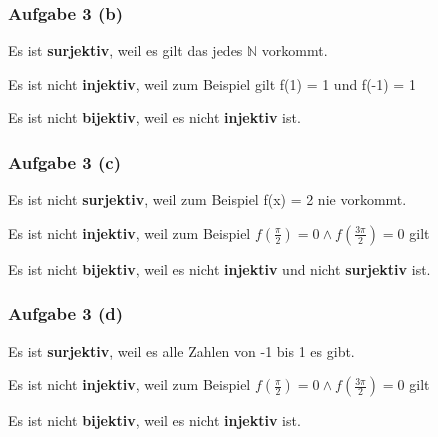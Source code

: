 \documentclass[a4paper, 10pt]{scrartcl}
\begin{document}
\subsubsection*{Aufgabe 3 \small(b)}
\begin{flushleft}
    Es ist \textbf{surjektiv}, weil es gilt das jedes $\mathbb{N}$ vorkommt.
\end{flushleft}
\begin{flushleft}
    Es ist nicht \textbf{injektiv}, weil zum Beispiel gilt f(1) = 1 und f(-1) = 1 
\end{flushleft} 
\begin{flushleft}
    Es ist nicht \textbf{bijektiv}, weil es nicht \textbf{injektiv} ist.
\end{flushleft}

\subsubsection*{Aufgabe 3 \small(c)}
\begin{flushleft}
    Es ist nicht \textbf{surjektiv}, weil zum Beispiel f(x) = 2 nie vorkommt. 
\end{flushleft}
\begin{flushleft}
    Es ist nicht \textbf{injektiv}, weil zum Beispiel $f(\frac{\pi}{2}) = 0 \wedge f(\frac{3\pi}{2}) = 0$ gilt
\end{flushleft} 
\begin{flushleft}
    Es ist nicht \textbf{bijektiv}, weil es nicht \textbf{injektiv} und nicht \textbf{surjektiv} ist.
\end{flushleft}

\subsubsection*{Aufgabe 3 \small(d)}
\begin{flushleft}
    Es ist \textbf{surjektiv}, weil es alle Zahlen von -1 bis 1 es gibt.
\end{flushleft}
\begin{flushleft}
    Es ist nicht \textbf{injektiv}, weil zum Beispiel $f(\frac{\pi}{2}) = 0 \wedge f(\frac{3\pi}{2}) = 0$ gilt
\end{flushleft} 
\begin{flushleft}
    Es ist nicht \textbf{bijektiv}, weil es nicht \textbf{injektiv} ist.
\end{flushleft}
\end{document}
